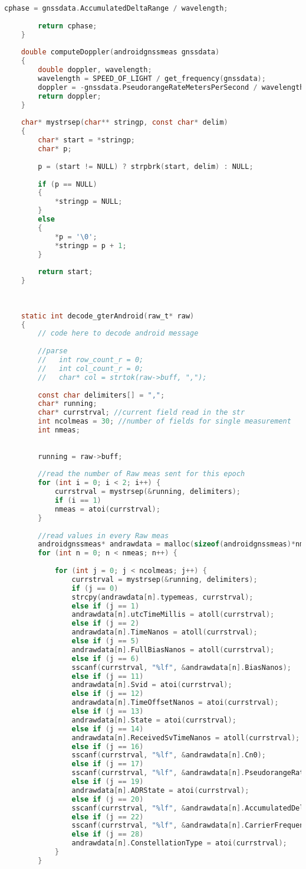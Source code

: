 \begin{lstlisting}[language=c]
		cphase = gnssdata.AccumulatedDeltaRange / wavelength;
		
		return cphase;
	}
	
	double computeDoppler(androidgnssmeas gnssdata)
	{
		double doppler, wavelength;
		wavelength = SPEED_OF_LIGHT / get_frequency(gnssdata);
		doppler = -gnssdata.PseudorangeRateMetersPerSecond / wavelength;
		return doppler;
	}
	
	char* mystrsep(char** stringp, const char* delim)
	{
		char* start = *stringp;
		char* p;
		
		p = (start != NULL) ? strpbrk(start, delim) : NULL;
		
		if (p == NULL)
		{
			*stringp = NULL;
		}
		else
		{
			*p = '\0';
			*stringp = p + 1;
		}
		
		return start;
	}
	
	
	
	static int decode_gterAndroid(raw_t* raw)
	{
		// code here to decode android message
		
		//parse
		//   int row_count_r = 0;
		//   int col_count_r = 0;
		//   char* col = strtok(raw->buff, ",");
		
		const char delimiters[] = ",";
		char* running;
		char* currstrval; //current field read in the str	
		int ncolmeas = 30; //number of fields for single measurement
		int nmeas;
		
		
		running = raw->buff;
		
		//read the number of Raw meas sent for this epoch
		for (int i = 0; i < 2; i++) {
			currstrval = mystrsep(&running, delimiters);
			if (i == 1)
			nmeas = atoi(currstrval);
		}
		
		//read values in every Raw meas 
		androidgnssmeas* andrawdata = malloc(sizeof(androidgnssmeas)*nmeas);
		for (int n = 0; n < nmeas; n++) {
			
			for (int j = 0; j < ncolmeas; j++) {
				currstrval = mystrsep(&running, delimiters);
				if (j == 0)
				strcpy(andrawdata[n].typemeas, currstrval);
				else if (j == 1)
				andrawdata[n].utcTimeMillis = atoll(currstrval);
				else if (j == 2)
				andrawdata[n].TimeNanos = atoll(currstrval);
				else if (j == 5)
				andrawdata[n].FullBiasNanos = atoll(currstrval);
				else if (j == 6)
				sscanf(currstrval, "%lf", &andrawdata[n].BiasNanos);
				else if (j == 11)
				andrawdata[n].Svid = atoi(currstrval);
				else if (j == 12)
				andrawdata[n].TimeOffsetNanos = atoi(currstrval);
				else if (j == 13)
				andrawdata[n].State = atoi(currstrval);
				else if (j == 14)
				andrawdata[n].ReceivedSvTimeNanos = atoll(currstrval);
				else if (j == 16)
				sscanf(currstrval, "%lf", &andrawdata[n].Cn0);
				else if (j == 17)
				sscanf(currstrval, "%lf", &andrawdata[n].PseudorangeRateMetersPerSecond);
				else if (j == 19)
				andrawdata[n].ADRState = atoi(currstrval);
				else if (j == 20)
				sscanf(currstrval, "%lf", &andrawdata[n].AccumulatedDeltaRange);
				else if (j == 22)
				sscanf(currstrval, "%lf", &andrawdata[n].CarrierFrequencyHz);
				else if (j == 28)
				andrawdata[n].ConstellationType = atoi(currstrval);
			}
		}
		

\end{lstlisting}
